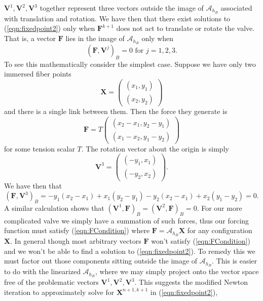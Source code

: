 \documentclass[preprint,12pt]{elsarticle}
\begin{document}
$\mathbf{V}^1,\mathbf{V}^2,\mathbf{V}^3$ together represent three vectors outside the image of $\mathcal{A}_{h_B}$ associated with translation and rotation.
We have then that there exist solutions to (\ref{eqn:fixedpoint2}) only when $\mathbf{F}^{k+1}$ does not act to translate or rotate the valve. That is, a vector $\mathbf{F}$ lies in the image of $\mathcal{A}_{h_B}$ only when 
\begin{equation}
( \mathbf{F}, \mathbf{V}^j )_B = 0
\textrm{ for } j=1,2,3.
\label{eqn:FCondition}
\end{equation}
To see this mathematically consider the simplest case. Suppose we have only two immersed fiber points
\begin{equation}
\mathbf{X}=
\left( \begin{array}{c}
(x_1,y_1)\\
(x_2,y_2)
\end{array} \right)
\end{equation}
and there is a single link between them. Then the force they generate is
\begin{equation}
\mathbf{F}=T
\left( \begin{array}{c}
(x_2-x_1,y_2-y_1)\\
(x_1-x_2,y_1-y_2)
\end{array} \right)
\end{equation}
for some tension scalar $T$.
The rotation vector about the origin is simply 
\begin{equation}
\mathbf{V}^3=
\left( \begin{array}{c}
(-y_1,x_1)\\
(-y_2,x_2)
\end{array} \right).
\end{equation}
We have then that
\begin{equation}
( \mathbf{F},\mathbf{V}^3 )_B =
-y_1(x_2-x_1) + x_1(y_2-y_1) - y_2(x_2-x_1) + x_2(y_1-y_2) = 0.
\end{equation}
A similar calculation shows that $( \mathbf{V}^1,\mathbf{F} )_B = ( \mathbf{V}^2,\mathbf{F} )_B = 0.$
For our more complicated valve we simply have a summation of such forces, thus our forcing function must satisfy (\ref{eqn:FCondition}) where $\mathbf{F}=\mathcal{A}_{h_B}\mathbf{X}$ for any configuration $\mathbf{X}$. In general though most arbitrary vectors $\mathbf{F}$ won't satisfy (\ref{eqn:FCondition}) and we won't be able to find a solution to (\ref{eqn:fixedpoint2}). To remedy this we must factor out those components sitting outside the image of $\mathcal{A}_{h_B}$. This is easier to do with the linearized $\mathcal{A}_{h_B}$, where we may simply project onto the vector space free of the problematic vectors $\mathbf{V}^1,\mathbf{V}^2,\mathbf{V}^3$. This suggests the modified Newton iteration to approximately solve for $\mathbf{X}^{n+1,k+1}$ in (\ref{eqn:fixedpoint2}),
\end{document}
